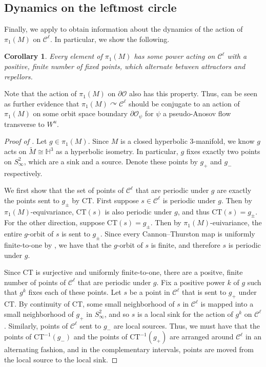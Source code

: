 \documentclass[11pt]{amsart}
\newcommand{\HH}[0]{\mathbb{H}}
\newcommand{\wt}{\widetilde}
\newcommand{\mc}{\mathcal}
\newcommand{\orb}{\mathcal{O}}
\newcommand{\ct}{\mathrm{CT}}
\numberwithin{equation}{section}
\newtheorem{corollary}[equation]{Corollary}
\theoremstyle{definition}
\begin{document}
\subsection{Dynamics on the leftmost circle}
Finally, we apply  to obtain information about the dynamics of the action of $\pi_1(M)$ on $\mc C^\ell$. In particular, we show the following.

\begin{corollary}\label{corollary:dynamics}
	Every element of $\pi_1(M)$ has some power acting on $\mc C^\ell$ with a positive, finite number of fixed points, which alternate between attractors and repellors.
\end{corollary}

Note that the action of $\pi_1(M)$ on $\partial\orb$ also has this property. Thus,  can be seen as further evidence that $\pi_1(M)\curvearrowright\mc C^\ell$ should be conjugate to an action of $\pi_1(M)$ on some orbit space boundary $\partial\orb_\psi$ for $\psi$ a pseudo-Anosov flow transverse to $W^u$.

\begin{proof}[Proof of ]
	Let $g\in\pi_1(M)$. Since $M$ is a closed hyperbolic 3-manifold, we know $g$ acts on $\wt M\cong\HH^3$ as a hyperbolic isometry. In particular, $g$ fixes exactly two points on $S^2_\infty$, which are a sink and a source. Denote these points by $g_+$ and $g_-$ respectively.
	
	We first show that the set of points of $\mc C^\ell$ that are periodic under $g$ are exactly the points sent to $g_\pm$ by $\ct$. First suppose $s\in\mc C^\ell$ is periodic under $g$. Then by $\pi_1(M)$-equivariance, $\ct(s)$ is also periodic under $g$, and thus $\ct(s)=g_\pm$. For the other direction, suppose $\ct(s)=g_\pm$. Then by $\pi_1(M)$-euivariance, the entire $g$-orbit of $s$ is sent to $g_\pm$. Since every Cannon--Thurston map is uniformly finite-to-one by \cite{FMP}, we have that the $g$-orbit of $s$ is finite, and therefore $s$ is periodic under $g$.
	
	Since $\ct$ is surjective and uniformly finite-to-one, there are a positve, finite number of points of $\mc C^\ell$ that are periodic under $g$. Fix a positive power $k$ of $g$ such that $g^k$ fixes each of these points. Let $s$ be a point in $\mc C^\ell$ that is sent to $g_+$ under $\ct$. By continuity of $\ct$, some small neighborhood of $s$ in $\mc C^\ell$ is mapped into a small neighborhood of $g_+$ in $S^2_\infty$, and so $s$ is a local sink for the action of $g^k$ on $\mc C^\ell$. Similarly, points of $\mc C^\ell$ sent to $g_-$ are local sources. Thus, we must have that the points of $\ct^{-1}(g_-)$ and the points of $\ct^{-1}(g_+)$ are arranged around $\mc C^\ell$ in an alternating fashion, and in the complementary intervals, points are moved from the local source to the local sink.
\end{proof}




\end{document}
